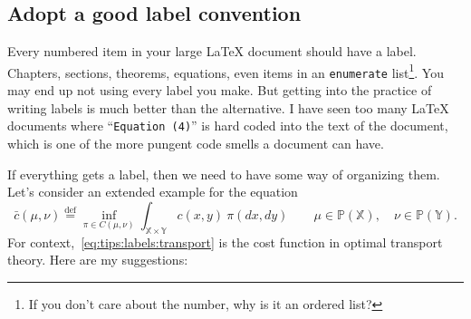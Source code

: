 \documentclass{article}
\begin{document}
\subsection{Adopt a good label convention} \label{ssec:tips:label_rules}

Every numbered item in your large \LaTeX{} document should have a label. Chapters, sections, theorems, equations, even items in an \texttt{enumerate} list\footnote{If you don't care about the number, why is it an ordered list?}. You may end up not using every label you make. But getting into the practice of writing labels is much better than the alternative. I have seen too many \LaTeX{} documents where ``\texttt{Equation (4)}'' is hard coded into the text of the document, which is one of the more pungent code smells a document can have.

If everything gets a label, then we need to have some way of organizing them. Let's consider an extended example for the equation
\begin{equation} \label{eq:tips:labels:transport}
    \bar{c}(\mu, \nu) \stackrel{\mathrm{def}}{=}
    \inf_{\pi \in C(\mu, \nu)}
    \int_{\mathbb{X} \times \mathbb{Y}}
    c(x,y) \
    \pi(dx,dy)
    \qquad \mu \in \mathbb{P}(\mathbb{X}),
    \quad  \nu \in \mathbb{P}(\mathbb{Y}).
\end{equation}
For context,~\eqref{eq:tips:labels:transport} is the cost function in optimal transport theory. Here are my suggestions:
\end{document}

